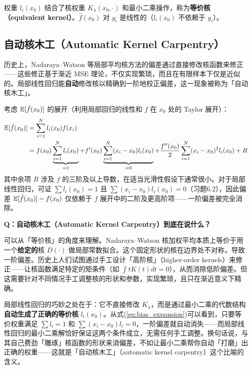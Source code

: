 权重 $l_i(x_0)$ 结合了核权重 $K_\lambda(x_0, \cdot)$ 和最小二乘操作，称为\textbf{等价核（equivalent kernel）}。$\hat{f}(x_0)$ 对 $y_i$ 是线性的（$l_i(x_0)$ 不依赖于 $y_i$）。

\subsection{自动核木工（Automatic Kernel Carpentry）}

历史上，Nadaraya--Watson 等局部平均核方法的偏差通过直接修改核函数来修正——这些修正基于渐近 MSE 理论，不仅实现繁琐，而且在有限样本下仅是近似的。局部线性回归能\textbf{自动}修改核以精确到一阶地校正偏差，这一现象被称为「自动核木工」。

考虑 $\mathbb{E}[\hat{f}(x_0)]$ 的展开（利用局部回归的线性和 $f$ 在 $x_0$ 处的 Taylor 展开）：
\begin{align}
    \mathbb{E}[\hat{f}(x_0)] &= \sum_{i=1}^{N} l_i(x_0) f(x_i) \nonumber \\
    &= f(x_0) \underbrace{\sum_{i=1}^{N} l_i(x_0)}_{=1}
       + f'(x_0) \underbrace{\sum_{i=1}^{N} (x_i - x_0) l_i(x_0)}_{=0}
       + \frac{f''(x_0)}{2} \sum_{i=1}^{N} (x_i - x_0)^2 l_i(x_0) + R \label{eq:bias_expansion}
\end{align}
其中余项 $R$ 涉及 $f$ 的三阶及以上导数，在适当光滑性假设下通常很小。对于局部线性回归，可证 $\sum l_i(x_0) = 1$ 且 $\sum (x_i - x_0) l_i(x_0) = 0$（习题6.2），因此偏差 $\mathbb{E}[\hat{f}(x_0)] - f(x_0)$ 仅依赖于 $f$ 展开中的二阶及更高阶项——一阶偏差被完全消除。

\medskip
\textbf{Q：自动核木工（Automatic Kernel Carpentry）到底在说什么？}

可以从「等价核」的角度来理解。Nadaraya--Watson 核加权平均本质上等价于用一个\textbf{给定的}核 $D(\cdot)$ 做局部常数拟合。这个固定形状的核在边界处不对称，导致一阶偏差。历史上人们试图通过手工设计「高阶核」（higher-order kernels）来修正——让核函数满足特定的矩条件（如 $\int t K(t) dt = 0$），从而消除低阶偏差。但这需要针对不同情况手工调整核的形状和参数，实现繁琐，且只在渐近意义下精确。

局部线性回归的巧妙之处在于：它不直接修改 $K_\lambda$，而是通过最小二乘的代数结构\textbf{自动生成了正确的等价核} $l_i(x_0)$。从式(\ref{eq:bias_expansion})可以看到，只要等价权重满足 $\sum l_i = 1$ 和 $\sum (x_i - x_0)l_i = 0$，一阶偏差就自动消失——而局部线性回归的最小二乘解恰好保证这两个条件成立，无需任何手工调整。换句话说，与其自己费劲「雕琢」核函数的形状来消偏差，不如让最小二乘帮你自动「打磨」出正确的权重——这就是「自动核木工」（automatic kernel carpentry）这个比喻的含义。

